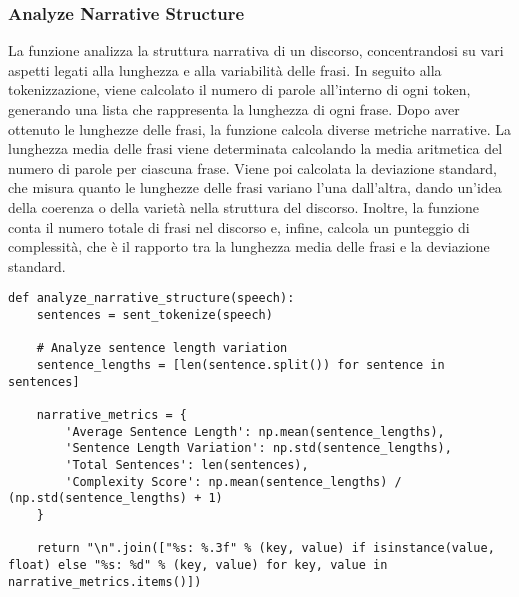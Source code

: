 \documentclass[12pt]{article}
\begin{document}
		\subsubsection{Analyze Narrative Structure}
La funzione analizza la struttura narrativa di un discorso, concentrandosi su vari aspetti legati alla lunghezza e alla variabilità delle frasi. In seguito alla tokenizzazione, viene calcolato il numero di parole all'interno di ogni token, generando una lista che rappresenta la lunghezza di ogni frase.
Dopo aver ottenuto le lunghezze delle frasi, la funzione calcola diverse metriche narrative. La lunghezza media delle frasi viene determinata calcolando la media aritmetica del numero di parole per ciascuna frase. Viene poi calcolata la deviazione standard, che misura quanto le lunghezze delle frasi variano l'una dall'altra, dando un'idea della coerenza o della varietà nella struttura del discorso. Inoltre, la funzione conta il numero totale di frasi nel discorso e, infine, calcola un punteggio di complessità, che è il rapporto tra la lunghezza media delle frasi e la deviazione standard.		
	\begin{lstlisting}
def analyze_narrative_structure(speech):
	sentences = sent_tokenize(speech)
	
	# Analyze sentence length variation
	sentence_lengths = [len(sentence.split()) for sentence in sentences]
	
	narrative_metrics = {
		'Average Sentence Length': np.mean(sentence_lengths),
		'Sentence Length Variation': np.std(sentence_lengths),
		'Total Sentences': len(sentences),
		'Complexity Score': np.mean(sentence_lengths) / (np.std(sentence_lengths) + 1)
	}

	return "\n".join(["%s: %.3f" % (key, value) if isinstance(value, float) else "%s: %d" % (key, value) for key, value in narrative_metrics.items()])

	\end{lstlisting}
			
\end{document}
